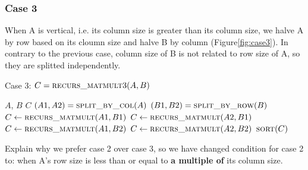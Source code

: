 \subsubsection{Case 3}
\label{sec:case3}
When A is vertical, i.e. its column size is greater than its column size, we halve A by row based on its cloumn size and halve B by column (Figure\ref{fig:case3}). In contrary to the previous case, column size of B is not related to row size of A, so they are splitted independently.

\begin{algorithm}[H] 
  \caption{Case 3: $C = \textsc{recurs\_matmult}3(A, B)$} \label{alg:case3} 
  \begin{algorithmic}[1]
    \Require $A$, $B$
    \Ensure  $C$
    \State $(A1, A2) = \textsc{split\_by\_col}(A)$
    \State $(B1, B2) = \textsc{split\_by\_row}(B)$
    \State $C \leftarrow \textsc{recurs\_matmult}(A1,B1)$
    \State $C \leftarrow \textsc{recurs\_matmult}(A2,B1)$
    \State $C \leftarrow \textsc{recurs\_matmult}(A1,B2)$
    \State $C \leftarrow \textsc{recurs\_matmult}(A2,B2)$
    \State $\textsc{sort}(C)$
  \end{algorithmic}
\end{algorithm}

Explain why we prefer case 2 over case 3, so we have changed condition for case 2 to: when A's row size is less than or equal to \textbf{a multiple of} its column size.
